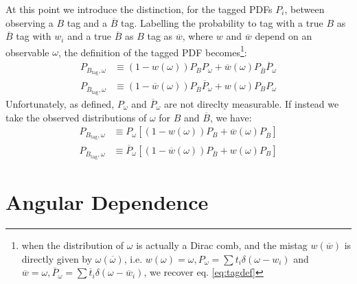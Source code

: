 \documentclass[a4paper,9pt,twosided]{article}
\begin{document}
\vfill
\pagebreak
At this point we introduce the distinction, for the tagged PDFs $P_i$, between observing a $B$ tag and a $\overline{B}$ tag.
Labelling the probability to tag with a true $B$ as $\overline{B}$ tag with $w_i$ and a true $\overline{B}$ as $B$ tag as $\overline{w}$,
where $w$ and $\overline{w}$ depend on an observable $\omega$,
the definition of the tagged PDF becomes\footnote{
when the distribution of $\omega$ is actually a Dirac comb, and the mistag $w(\overline{w})$ is directly given by $\omega(\overline{\omega})$, i.e. $ w(\omega) = \omega, P_\omega = \sum t_i \delta(\omega-w_i)$ 
and $\overline{w} = \omega, \overline{P}_\omega = \sum \overline{t}_i \delta(\omega-\overline{w}_i) $, we recover
eq. \ref{eq:tagdef}}:
\begin{eqnarray}
   P_{B_\mathrm{tag},\omega} &\equiv  (1-w(\omega)) P_{B} P_\omega  + \overline{w}(\omega) P_{\overline{ B} }\overline{P}_\omega \\
   P_{\overline{B}_\mathrm{tag},\omega} &\equiv (1-\overline{w}(\omega)) P_{\overline{B}}\overline{P}_\omega  +  w(\omega) P_{ B } P_\omega
\end{eqnarray} 
Unfortunately, as defined, $P_\omega$ and $\overline{P}_\omega$ are not direclty measurable.
If instead we take the observed distributions of $\omega$ for $B$  and $\overline{B}$, we have:
\begin{eqnarray}
   P_{B_\mathrm{tag},\omega} &\equiv P_\omega \left[ (1-w(\omega)) P_{B} + \overline{w}(\omega) P_{\overline{ B} } \right]\\
   P_{\overline{B}_\mathrm{tag},\omega} &\equiv \overline{P}_\omega\left[ (1-\overline{w}(\omega)) P_{\overline{B}} +  w(\omega) P_{ B } \right]
\end{eqnarray} 

\section{Angular Dependence}
\end{document}
